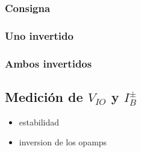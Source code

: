 \documentclass[../../main.tex]{subfiles}
\begin{document}
\subsubsection{Consigna}
\subsubsection{Uno invertido}
\subsubsection{Ambos invertidos}












\subsection{Medici\'on de $V_{IO}$ y $I_B^\pm$}


\begin{itemize}
	\item estabilidad
	\item inversion de los opamps
\end{itemize}
\end{document}
